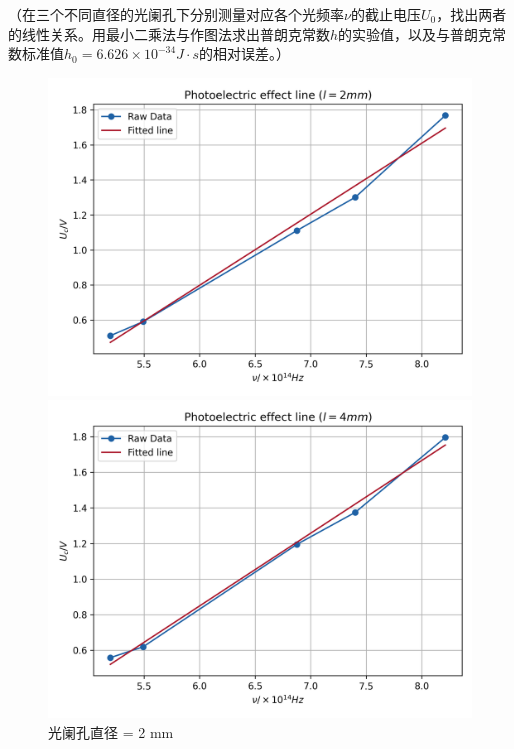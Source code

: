 \documentclass{ctexart}
\begin{document}
（在三个不同直径的光阑孔下分别测量对应各个光频率$\nu$的截止电压$U_0$，找出两者的线性关系。用最小二乘法与作图法求出普朗克常数$h$的实验值，以及与普朗克常数标准值$h_0 = 6.626 \times 10^{-34} J \cdot s$的相对误差。）

\begin{figure}[h!]
    \centering
    \begin{minipage}[b]{0.45\textwidth}
        \centering
        \includegraphics[width=\textwidth]{l_2.png}
        \caption{光阑孔直径 = 2 mm}
    \end{minipage}
    \hfill
    \begin{minipage}[b]{0.45\textwidth}
        \centering
        \includegraphics[width=\textwidth]{l_4.png}

\end{minipage}
\end{figure}
\end{document}
